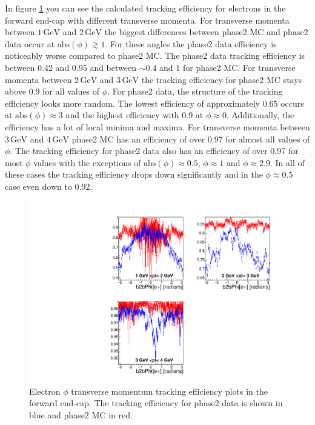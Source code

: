 \documentclass[a4paper,11pt,twosided,final,german,openbib,pdftex,listof=totoc,bibliography=totoc]{scrbook}
\begin{document}
In figure \ref{plt:xPtMPhiemFC} you can see the calculated tracking efficiency for electrons in the forward end-cap  with different transverse momenta. 
For transverse momenta between $1\,\textrm{GeV}$ and $2\,\textrm{GeV}$ the biggest differences between phase2 MC and phase2 data occur at $\textrm{abs}(\phi) \gtrsim 1$. For these angles the phase2 data efficiency is noticeably worse compared to phase2 MC. The phase2 data tracking efficiency is between 0.42 and 0.95 and between $\sim 0.4$ and 1 for phase2 MC. 
For transverse momenta between $2\,\textrm{GeV}$ and $3\,\textrm{GeV}$ the tracking efficiency for phase2 MC stays above 0.9 for all values of $\phi$. For phase2 data, the structure of the tracking efficiency looks more random. The lowest efficiency of approximately 0.65 occurs at $\textrm{abs}(\phi) \approx 3$ and the highest efficiency with $0.9$ at $\phi \approx 0$. Additionally, the efficiency has a lot of local minima and maxima. 
For transverse momenta between $3\,\textrm{GeV}$ and $4\,\textrm{GeV}$ phase2 MC has an efficiency of over 0.97 for almost all values of $\phi$. The tracking efficiency for phase2 data also has an efficiency of over 0.97 for most $\phi$ values with the exceptions of $\textrm{abs}(\phi) \approx 0.5$, $\phi  \approx 1$ and $\phi \approx 2.9$. In all of these cases the tracking efficiency drops down significantly and in the $\phi \approx 0.5$ case even down to 0.92.

\begin{figure}[!htbp]
	\centering
	\includegraphics[width=\textwidth]{Plots/master/xPtMPhiemFC}
	\caption[Transverse Momentum $\phi$ Electron Forward End-Cap Efficiency Phase2]{Electron $\phi$ transverse momentum tracking efficiency plots in the forward end-cap. The tracking efficiency for phase2 data is shown in blue and phase2 MC in red.
		\label{plt:xPtMPhiemFC}}
\end{figure}
\end{document}
